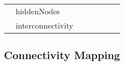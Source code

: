 \begin{table}[]
{\begin{tabular}{lllllll}
                                                                                             & hiddenNodes        &                                                                                   &                                                                             &                                                                                 &                                                                          & ~\cite{hiddennodes}           \\
                                                                                             & interconnectivity  &                                                                                   &                                                                             &                                                                                 &                                                                          & ~\cite{RN78}                  \\ \hline
\end{tabular}%
}
\end{table}

\subsection{Connectivity Mapping} %
\label{sub:connectivitymapping}

